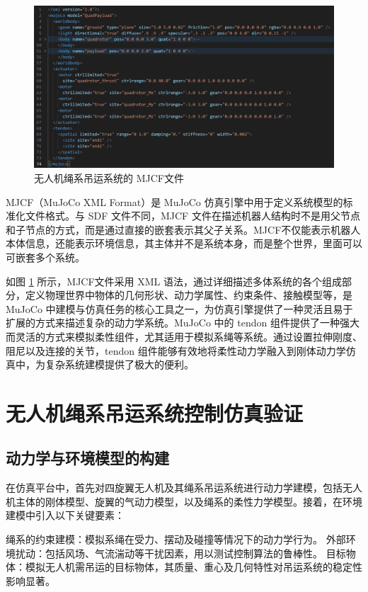 \documentclass[lang=chs, degree=master, blindreview=false, winfonts=true]{yanputhesis}
\begin{document}
\begin{figure}[hbt!]
	\centering
	\includegraphics[width=36pc]{picture/MJCF.png} 
	\caption{无人机绳系吊运系统的 MJCF文件} 
	\label{MJCF}
\end{figure}
MJCF（MuJoCo XML Format）是 MuJoCo 仿真引擎中用于定义系统模型的标准化文件格式。与 SDF 文件不同，MJCF 文件在描述机器人结构时不是用父节点和子节点的方式，而是通过直接的嵌套表示其父子关系。MJCF不仅能表示机器人本体信息，还能表示环境信息，其主体并不是系统本身，而是整个世界，里面可以可嵌套多个系统。

如图 \ref{MJCF} 所示，MJCF文件采用 XML 语法，通过详细描述多体系统的各个组成部分，定义物理世界中物体的几何形状、动力学属性、约束条件、接触模型等，是 MuJoCo 中建模与仿真任务的核心工具之一，为仿真引擎提供了一种灵活且易于扩展的方式来描述复杂的动力学系统。MuJoCo 中的 tendon 组件提供了一种强大而灵活的方式来模拟柔性组件，尤其适用于模拟系绳等系统。通过设置拉伸刚度、阻尼以及连接的关节，tendon 组件能够有效地将柔性动力学融入到刚体动力学仿真中，为复杂系统建模提供了极大的便利。


\section{无人机绳系吊运系统控制仿真验证}
\subsection{动力学与环境模型的构建}
在仿真平台中，首先对四旋翼无人机及其绳系吊运系统进行动力学建模，包括无人机主体的刚体模型、旋翼的气动力模型，以及绳系的柔性力学模型。接着，在环境建模中引入以下关键要素：

绳系的约束建模：模拟系绳在受力、摆动及碰撞等情况下的动力学行为。
外部环境扰动：包括风场、气流湍动等干扰因素，用以测试控制算法的鲁棒性。
目标物体：模拟无人机需吊运的目标物体，其质量、重心及几何特性对吊运系统的稳定性影响显著。
\end{document}
